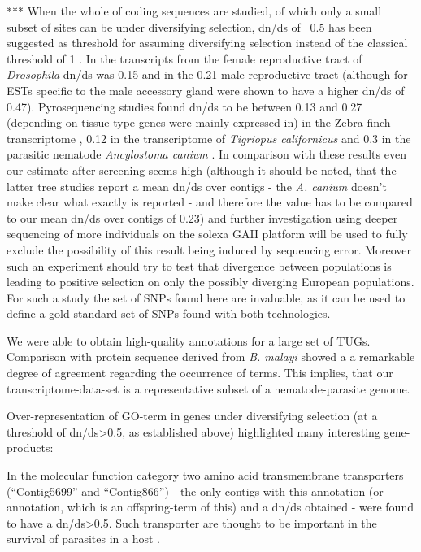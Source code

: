 \documentclass[10pt]{bmc_article}
\newenvironment{bmcformat}{\begin{raggedright}\baselineskip20pt\sloppy\setboolean{publ}{false}}{\end{raggedright}\baselineskip20pt\sloppy}
\begin{document}
\begin{bmcformat}
 


***
When the whole of coding sequences are studied, of which only a small
subset of sites can be under diversifying selection, dn/ds of ~0.5 has
been suggested as threshold for assuming diversifying selection
\cite{pmid15579698} instead of the classical threshold of 1
\cite{pmid6449605}. In the transcripts from the female reproductive
tract of \textit{Drosophila} dn/ds was 0.15 \cite{pmid15579698} and in
the 0.21 male reproductive tract \cite{pmid11404480} (although for ESTs
specific to the male accessory gland were shown to have a higher dn/ds
of 0.47). Pyrosequencing studies found dn/ds to be between 0.13 and
0.27 (depending on tissue type genes were mainly expressed in) in the
Zebra finch transcriptome \cite{pmid20359325}, 0.12 in the
transcriptome of \textit{Tigriopus californicus} \cite{pmid21199025}
and 0.3 in the parasitic nematode \textit{Ancylostoma canium}
\cite{pmid20470405}. In comparison with these results even our
estimate after screening seems high (although it should be noted, that
the latter tree studies report a mean dn/ds over contigs - the
\textit{A. canium} doesn't make clear what exactly is reported - and
therefore the value has to be compared to our mean dn/ds over contigs
of 0.23) and further
investigation using deeper sequencing of more individuals on the
solexa GAII platform will be used to fully exclude the possibility of
this result being induced by sequencing error. Moreover such an
experiment should try to test that divergence between populations is
leading to positive selection on only the possibly diverging European
populations. For such a study the set of SNPs found here are
invaluable, as it can be used to define a gold standard set of SNPs
found with both technologies.

We were able to obtain high-quality annotations for a large set of
TUGs. Comparison with protein sequence derived from \textit{B. malayi}
showed a a remarkable degree of agreement regarding the occurrence of
terms. This implies, that our transcriptome-data-set is a
representative subset of a nematode-parasite
genome. 

Over-representation of GO-term in genes under diversifying selection
(at a threshold of dn/ds>0.5, as established above) highlighted many
interesting gene-products:

In the molecular function category two amino acid transmembrane
transporters (``Contig5699'' and ``Contig866'') - the only contigs
with this annotation (or annotation, which is an offspring-term of
this) and a dn/ds obtained - were found to have a dn/ds>0.5. Such
transporter are thought to be important in the survival of parasites in
a host \cite{pmid18272295}.


\end{bmcformat}
\end{document}
